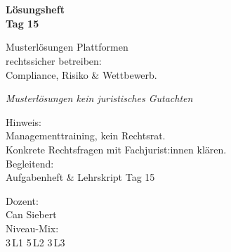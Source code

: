\documentclass[11pt,a4paper,oneside]{article}
\newcommand{\caveatfontfallback}{\itshape}
\newcommand\caveatfont{\caveatfontfallback}%
\begin{document}
\begin{titlepage}
  \pagestyle{empty}
  \vspace*{1.5cm}
  \\[2pt]
  \noindent{\color{lpAccent}\rule{\linewidth}{1.2pt}}\\[4pt]

  \vspace{3cm}
  {\sffamily\fontsize{30}{34}\selectfont\bfseries\color{lpInk}Lösungsheft\\Tag 15\par}

  \vspace{0.7cm}
  {\sffamily\large\color{lpGray}Musterlösungen \textendash{} Plattformen\\rechtssicher betreiben:\\Compliance, Risiko \& Wettbewerb.\par}

  \vspace{1.5cm}
  {\caveatfont\LARGE\color{lpGreen}Musterlösungen \textperiodcentered{} kein juristisches Gutachten}\par

  \vfill

  \noindent\begin{minipage}{0.55\linewidth}
    {\sffamily\footnotesize\color{lpGray}Hinweis:}\\
    {\sffamily\small\color{lpInk}Managementtraining, kein Rechtsrat.\\Konkrete Rechtsfragen mit Fachjurist:innen klären.}\\[10pt]
    {\sffamily\footnotesize\color{lpGray}Begleitend:}\\
    {\sffamily\small\color{lpInk}Aufgabenheft \& Lehrskript Tag 15}
  \end{minipage}\hfill
  \begin{minipage}{0.4\linewidth}
    \raggedleft
    {\sffamily\footnotesize\color{lpGray}Dozent:}\\
    {\sffamily\small\color{lpInk}Can Siebert}\\[10pt]
    {\sffamily\footnotesize\color{lpGray}Niveau-Mix:}\\
    {\sffamily\small\color{lpInk}3\,L1 \textperiodcentered{} 5\,L2 \textperiodcentered{} 3\,L3}
  \end{minipage}

  \vspace{0.5cm}
  \noindent{\color{lpAccent}\rule{\linewidth}{0.6pt}}
\end{titlepage}
\end{document}
